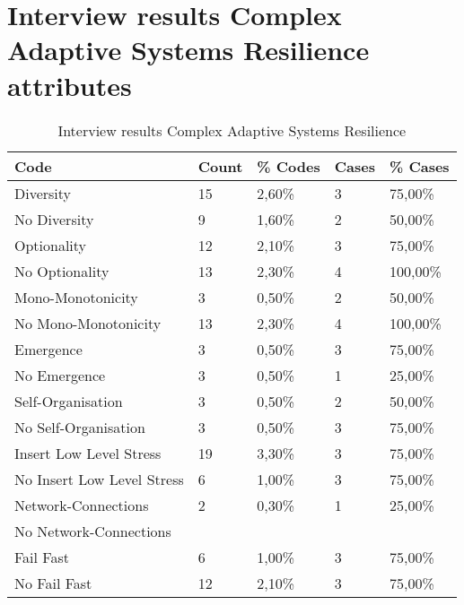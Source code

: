 \section{Interview results Complex Adaptive Systems Resilience attributes}
\label{sec:interviewresultscasresilience}
\begin{table}[H]
	\centering
	\begin{tabular}{lllll}
		\toprule
		\textbf{Code} & \textbf{Count} & \textbf{\% Codes} &\textbf{Cases} & \textbf{\% Cases} \\
		\midrule
		Diversity & 15    & 2,60\% & 3     & 75,00\% \\
		No Diversity & 9     & 1,60\% & 2     & 50,00\% \\
		Optionality & 12    & 2,10\% & 3     & 75,00\% \\
		No Optionality & 13    & 2,30\% & 4     & 100,00\% \\
		Mono-Monotonicity & 3     & 0,50\% & 2     & 50,00\% \\
		No Mono-Monotonicity & 13    & 2,30\% & 4     & 100,00\% \\
		Emergence & 3     & 0,50\% & 3     & 75,00\% \\
		No Emergence & 3     & 0,50\% & 1     & 25,00\% \\
		Self-Organisation & 3     & 0,50\% & 2     & 50,00\% \\
		No Self-Organisation & 3     & 0,50\% & 3     & 75,00\% \\
		Insert Low Level Stress & 19    & 3,30\% & 3     & 75,00\% \\
		No Insert Low Level Stress & 6     & 1,00\% & 3     & 75,00\% \\
		Network-Connections & 2     & 0,30\% & 1     & 25,00\% \\
		No Network-Connections &       &       &       &  \\
		Fail Fast & 6     & 1,00\% & 3     & 75,00\% \\
		No Fail Fast & 12    & 2,10\% & 3     & 75,00\% \\
		\bottomrule
	\end{tabular}%
	\caption{Interview results Complex Adaptive Systems Resilience}
	\label{tab:interviewresultscasresilience}%
\end{table}%
